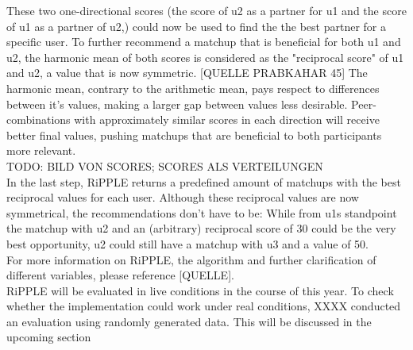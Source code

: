 \documentclass[nochapterpage,bigchapter,linedtoc,longdoc,colorback,accentcolor=tud3b]{tudreport}
\begin{document}
These two one-directional scores (the score of u2 as a partner for u1 and the score of u1 as a partner of u2,) could now be used to find the the best partner for a specific user. To further recommend a matchup that is beneficial for both u1 and u2, the harmonic mean of both scores is considered as the "reciprocal score" of u1 and u2, a value that is now symmetric. [QUELLE PRABKAHAR 45] The harmonic mean, contrary to the arithmetic mean, pays respect to differences between it's values, making a larger gap between values less desirable. Peer-combinations with approximately similar scores in each direction will receive better final values, pushing matchups that are beneficial to both participants more relevant.\\
TODO: BILD VON SCORES; SCORES ALS VERTEILUNGEN\\
In the last step, RiPPLE returns a predefined amount of matchups with the best reciprocal values for each user. Although these reciprocal values are now symmetrical, the recommendations don't have to be: While from u1s standpoint the matchup with u2 and an (arbitrary) reciprocal score of 30 could be the very best opportunity, u2 could still have a matchup with u3 and a value of 50.\\
For more information on RiPPLE, the algorithm and further clarification of different variables, please reference [QUELLE].\\	
RiPPLE will be evaluated in live conditions in the course of this year. To check whether the implementation could work under real conditions, XXXX conducted an evaluation using randomly generated data. This will be discussed in the upcoming section\\
\end{document}
